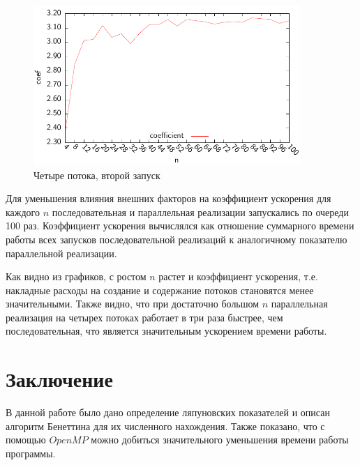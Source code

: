 \documentclass{spisok-article}
\begin{document}
\begin{figure}[hp]
    \begin{center}
        \includegraphics[width=0.9\textwidth]{plot_4-2.pdf}
    \end{center}
    \caption{Четыре потока, второй запуск}\label{fig:four_threads_2}
\end{figure}

Для уменьшения влияния внешних факторов на коэффициент ускорения для каждого $n$ последовательная и параллельная реализации запускались по очереди 100 раз. Коэффициент ускорения вычислялся как отношение суммарного времени работы всех запусков последовательной реализаций к аналогичному показателю параллельной реализации.

Как видно из графиков, с ростом $n$ растет и коэффициент ускорения, т.е. накладные расходы на создание и содержание потоков становятся менее значительными. Также видно, что при достаточно большом $n$ параллельная реализация на четырех потоках работает в три раза быстрее, чем последовательная, что является значительным ускорением времени работы.

\section{Заключение}
В данной работе было дано определение ляпуновских показателей и описан алгоритм Бенеттина для их численного нахождения. Также показано, что с помощью $OpenMP$ можно добиться значительного уменьшения времени работы программы.
\end{document}
